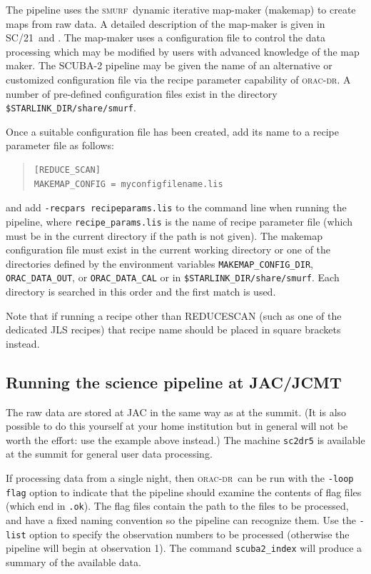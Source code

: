 \documentclass[twoside,11pt]{article}
\newcommand{\xref}[3]{#1}
\renewcommand{\_}{\texttt{\symbol{95}}}
\newenvironment{myquote}{\begin{quote}\begin{small}}{\end{small}\end{quote}}
\newcommand{\SMURF}{\textsc{smurf}}
\newcommand{\SMURFcook}{\xref{SC/21}{sc21}{}}
\newcommand{\oracdr}{\textsc{orac-dr}}
\newcommand{\task}[1]{\textsf{#1}}
\newcommand{\makemap}{\xref{\task{makemap}}{sun258}{MAKEMAP}}
\begin{document}
The pipeline uses the \SMURF\ dynamic iterative map-maker (\makemap)
to create maps from raw data. A detailed description of the map-maker
is given in \SMURFcook\ and \cite{smurfpaper}. The map-maker uses a
configuration file to control the data processing which may be
modified by users with advanced knowledge of the map maker. The
SCUBA-2 pipeline may be given the name of an alternative or customized
configuration file via the recipe parameter capability of \oracdr. A
number of pre-defined configuration files exist in the directory
\verb+$STARLINK_DIR/share/smurf+.

Once a suitable configuration file has been created, add its name to a
recipe parameter file as follows:
\begin{myquote}
\begin{verbatim}
[REDUCE_SCAN]
MAKEMAP_CONFIG = myconfigfilename.lis
\end{verbatim}
\end{myquote}
and add \texttt{-recpars recipe\_params.lis} to the command line when
running the pipeline, where \verb+recipe_params.lis+ is the name of
recipe parameter file (which must be in the current directory if the
path is not given). The \task{makemap} configuration file must exist
in the current working directory or one of the directories defined by
the environment variables \verb+MAKEMAP_CONFIG_DIR+,
\verb+ORAC_DATA_OUT+, or \verb+ORAC_DATA_CAL+ or in
\verb+$STARLINK_DIR/share/smurf+. Each directory is searched in this
order and the first match is used.

Note that if running a recipe other than REDUCE\_SCAN (such as one of
the dedicated JLS recipes) that recipe name should be placed in square
brackets instead.

\subsection{Running the science pipeline at JAC/JCMT}

The raw data are stored at JAC in the same way as at the summit. (It
is also possible to do this yourself at your home institution but in
general will not be worth the effort: use the example above instead.)
The machine \verb+sc2dr5+ is available at the summit for general user
data processing.

If processing data from a single night, then \oracdr\ can be run with
the \texttt{-loop flag} option to indicate that the pipeline should
examine the contents of flag files (which end in \verb+.ok+). The flag
files contain the path to the files to be processed, and have a fixed
naming convention so the pipeline can recognize them. Use the
\texttt{-list} option to specify the observation numbers to be
processed (otherwise the pipeline will begin at observation 1). The
command \verb+scuba2_index+ will produce a summary of the available
data.
\end{document}
